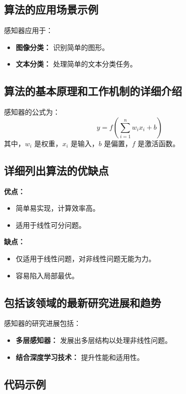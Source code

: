 \subsection*{算法的应用场景示例}
感知器应用于：
\begin{itemize}
    \item \textbf{图像分类：} 识别简单的图形。
    \item \textbf{文本分类：} 处理简单的文本分类任务。
\end{itemize}

\subsection*{算法的基本原理和工作机制的详细介绍}
感知器的公式为：
\[
    y = f(\sum_{i=1}^{n} w_i x_i + b)
\]
其中，\(w_i\) 是权重，\(x_i\) 是输入，\(b\) 是偏置，\(f\) 是激活函数。

\subsection*{详细列出算法的优缺点}
\textbf{优点：}
\begin{itemize}
    \item 简单易实现，计算效率高。
    \item 适用于线性可分问题。
\end{itemize}

\textbf{缺点：}
\begin{itemize}
    \item 仅适用于线性问题，对非线性问题无能为力。
    \item 容易陷入局部最优。
\end{itemize}

\subsection*{包括该领域的最新研究进展和趋势}
感知器的研究进展包括：
\begin{itemize}
    \item \textbf{多层感知器：} 发展出多层结构以处理非线性问题。
    \item \textbf{结合深度学习技术：} 提升性能和适用性。
\end{itemize}
\subsection*{代码示例}
\begin{lstlisting}

\end{lstlisting}


